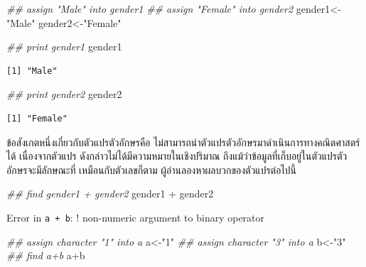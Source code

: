 \documentclass[
  a4paper,
]{book}
\newenvironment{Shaded}{\begin{snugshade}}{\end{snugshade}}
\newcommand{\DocumentationTok}[1]{\textcolor[rgb]{0.37,0.37,0.37}{\textit{#1}}}
\newcommand{\NormalTok}[1]{\textcolor[rgb]{0.00,0.23,0.31}{#1}}
\newcommand{\OtherTok}[1]{\textcolor[rgb]{0.00,0.23,0.31}{#1}}
\newcommand{\SpecialCharTok}[1]{\textcolor[rgb]{0.37,0.37,0.37}{#1}}
\newcommand{\StringTok}[1]{\textcolor[rgb]{0.13,0.47,0.30}{#1}}
\begin{document}
\begin{Shaded}
\begin{Highlighting}[]
\DocumentationTok{\#\# assign "Male" into gender1}
\DocumentationTok{\#\# assign "Female" into gender2}
\NormalTok{gender1}\OtherTok{\textless{}{-}}\StringTok{"Male"}
\NormalTok{gender2}\OtherTok{\textless{}{-}}\StringTok{"Female"}
\end{Highlighting}
\end{Shaded}

\begin{Shaded}
\begin{Highlighting}[]
\DocumentationTok{\#\# print gender1}
\NormalTok{gender1}
\end{Highlighting}
\end{Shaded}

\begin{verbatim}
[1] "Male"
\end{verbatim}

\begin{Shaded}
\begin{Highlighting}[]
\DocumentationTok{\#\# print gender2}
\NormalTok{gender2}
\end{Highlighting}
\end{Shaded}

\begin{verbatim}
[1] "Female"
\end{verbatim}

ข้อสังเกตหนึ่งเกี่ยวกับตัวแปรตัวอักษรคือ
ไม่สามารถนำตัวแปรตัวอักษรมาดำเนินการทางคณิตศาสตร์ได้ เนื่องจากตัวแปร
ดังกล่าวไม่ได้มีความหมายในเชิงปริมาณ ถึงแม้ว่าข้อมูลที่เก็บอยู่ในตัวแปรตัวอักษรจะมีลักษณะที่
เหมือนกับตัวเลขก็ตาม ผู้อ่านลองหาผลบวกของตัวแปรต่อไปนี้

\begin{Shaded}
\begin{Highlighting}[]
\DocumentationTok{\#\# find gender1 + gender2}
\NormalTok{gender1 }\SpecialCharTok{+}\NormalTok{ gender2}
\end{Highlighting}
\end{Shaded}

Error in \texttt{a\ +\ b}: ! non-numeric argument to binary operator

\begin{Shaded}
\begin{Highlighting}[]
\DocumentationTok{\#\# assign character "1" into a}
\NormalTok{a}\OtherTok{\textless{}{-}}\StringTok{"1"}
\DocumentationTok{\#\# assign character "3" into a}
\NormalTok{b}\OtherTok{\textless{}{-}}\StringTok{"3"}
\DocumentationTok{\#\# find a+b}
\NormalTok{a}\SpecialCharTok{+}\NormalTok{b}
\end{Highlighting}
\end{Shaded}
\end{document}
